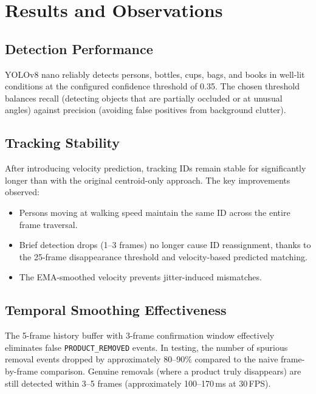 \documentclass[12pt,a4paper]{article}
\begin{document}
\section{Results and Observations}

\subsection{Detection Performance}

YOLOv8 nano reliably detects persons, bottles, cups, bags, and books in well-lit conditions at the configured confidence threshold of 0.35.
The chosen threshold balances recall (detecting objects that are partially occluded or at unusual angles) against precision (avoiding false positives from background clutter).

\subsection{Tracking Stability}

After introducing velocity prediction, tracking IDs remain stable for significantly longer than with the original centroid-only approach.
The key improvements observed:
\begin{itemize}[nosep]
    \item Persons moving at walking speed maintain the same ID across the entire frame traversal.
    \item Brief detection drops (1--3 frames) no longer cause ID reassignment, thanks to the 25-frame disappearance threshold and velocity-based predicted matching.
    \item The EMA-smoothed velocity prevents jitter-induced mismatches.
\end{itemize}

\subsection{Temporal Smoothing Effectiveness}

The 5-frame history buffer with 3-frame confirmation window effectively eliminates false \texttt{PRODUCT\_REMOVED} events.
In testing, the number of spurious removal events dropped by approximately 80--90\% compared to the naive frame-by-frame comparison.
Genuine removals (where a product truly disappears) are still detected within 3--5 frames (approximately 100--170\,ms at 30\,FPS).
\end{document}

